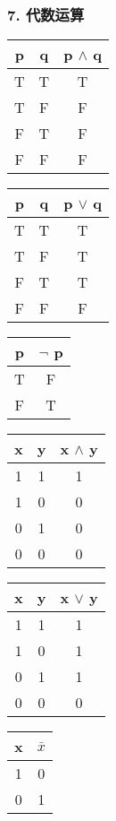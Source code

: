 \documentclass{beamer}
\begin{document}
\begin{CJK*}{UTF8}{gbsn}
\begin{frame}
  \frametitle{7. 代数运算}
  \begin{tabular}{cc|c}
    p& q& p $\land$ q\\
    \hline
    T&T&T\\
    T&F&F\\
    F&T&F\\
    F&F&F\\
  \end{tabular}\hspace{1cm}
  \begin{tabular}{cc|c}
    p& q& p $\lor$ q\\
    \hline
    T&T&T\\
    T&F&T\\
    F&T&T\\
    F&F&F\\
  \end{tabular}\hspace{1cm}
  \begin{tabular}{c|c}
    p& $\lnot$ p\\
    \hline
    T&F\\
    F&T\\
  \end{tabular}

  \vspace{1cm}\pause
    \begin{tabular}{cc|c}
    x& y& x $\land$ y\\
    \hline
    1&1&1\\
    1&0&0\\
    0&1&0\\
    0&0&0\\
  \end{tabular}\hspace{1cm}
  \begin{tabular}{cc|c}
    x& y& x $\lor$ y\\
    \hline
    1&1&1\\
    1&0&1\\
    0&1&1\\
    0&0&0\\
  \end{tabular}\hspace{1cm}
  \begin{tabular}{c|c}
    x& $\bar{x}$\\
    \hline
    1&0\\
    0&1\\
  \end{tabular}


\end{frame}
\end{CJK*}
\end{document}
